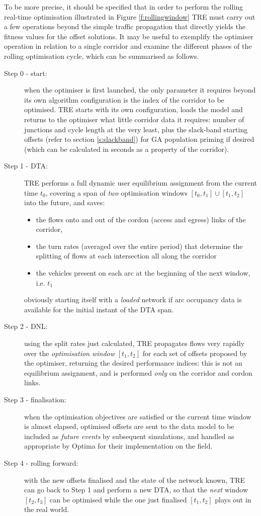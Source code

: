 To be more precise, it should be specified that in order to perform the rolling real-time optimisation illustrated in Figure \ref{f:rollingwindow} TRE must carry out a few operations beyond the simple traffic propagation that directly yields the fitness values for the offset solutions.
It may be useful to exemplify the optimiser operation in relation to a single corridor and examine the different phases of the rolling optimisation cycle, which can be summarised as follows.
\begin{description}
\item[Step 0 - start:] when the optimiser is first launched, the only parameter it requires beyond its own algorithm configuration is the index of the corridor to be optimised. TRE starts with its own configuration, loads the model and returns to the optimiser what little corridor data it requires: number of junctions and cycle length at the very least, plus the slack-band starting offsets (refer to section \ref{s:slackband}) for GA population priming if desired (which can be calculated in seconds as a property of the corridor).
\item[Step 1 - DTA:] TRE performs a full dynamic user equilibrium assignment from the current time $t_0$, covering a span of \emph{two} optimisation windows $[t_0,t_1]\cup[t_1, t_2]$ into the future, and saves:
\begin{itemize}
\item the flows onto and out of the cordon (access and egress) links of the corridor,
\item the turn rates (averaged over the entire period) that determine the splitting of flows at each intersection all along the corridor
\item the vehicles present on each arc at the beginning of the next window, i.e. $t_1$
\end{itemize}
obviously starting itself with a \emph{loaded} network if arc occupancy data is available for the initial instant of the DTA span.
\item[Step 2 - DNL:] using the split rates just calculated, TRE propagates flows very rapidly over the \emph{optimisation window} $[t_1,t_2]$ for each set of offsets proposed by the optimiser, returning the desired performance indices: this is not an equilibrium assignment, and is performed \emph{only} on the corridor and cordon links.
\item[Step 3 - finalisation:] when the optimisation objectives are satisfied or the current time window is almost elapsed, optimised offsets are sent to the data model to be included as \emph{future events} by subsequent simulations, and handled as appropriate by Optima for their implementation on the field.
\item[Step 4 - rolling forward:] with the new offsets finalised and the state of the network known, TRE can go back to Step 1 and perform a new DTA, so that the \emph{next} window $[t_2,t_3]$ can be optimised while the one just finalised $[t_1,t_2]$ plays out in the real world.
\end{description}


